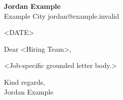 \documentclass[11pt,a4paper]{article}
\begin{document}
{\Large\textbf{Jordan Example}}\\
Example City \quad jordan@example.invalid

<DATE>

Dear <Hiring Team>,

<Job-specific grounded letter body.>

Kind regards,\\
Jordan Example
\end{document}

